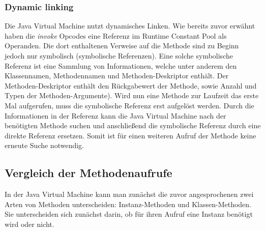 \documentclass[conference]{IEEEtran}
\begin{document}
\subsubsection{Dynamic linking}
Die Java Virtual Machine nutzt dynamisches Linken. Wie bereits zuvor erwähnt haben die \textit{invoke} Opcodes eine Referenz im Runtime Constant Pool als Operanden. Die dort enthaltenen Verweise auf die Methode sind zu Beginn jedoch nur symbolisch (symbolische Referenzen). Eine solche symbolische Referenz ist eine Sammlung von Informationen, welche unter anderem den Klassennamen, Methodennamen und Methoden-Deskriptor enthält. Der Methoden-Deskriptor enthält den Rückgabewert der Methode, sowie Anzahl und Typen der Methoden-Argumente). Wird nun eine Methode zur Laufzeit das erste Mal aufgerufen, muss die symbolische Referenz erst aufgelöst werden. Durch die Informationen in der Referenz kann die Java Virtual Machine nach der benötigten Methode suchen und anschließend die symbolische Referenz durch eine direkte Referenz ersetzen. Somit ist für einen weiteren Aufruf der Methode keine erneute Suche notwendig.\cite{Venners.1997}


\subsection{Vergleich der Methodenaufrufe}
In der Java Virtual Machine kann man zunächst die zuvor angesprochenen zwei Arten von Methoden unterscheiden: Instanz-Methoden und Klassen-Methoden. Sie unterscheiden sich zunächst darin, ob für ihren Aufruf eine Instanz benötigt wird oder nicht. 
\end{document}
